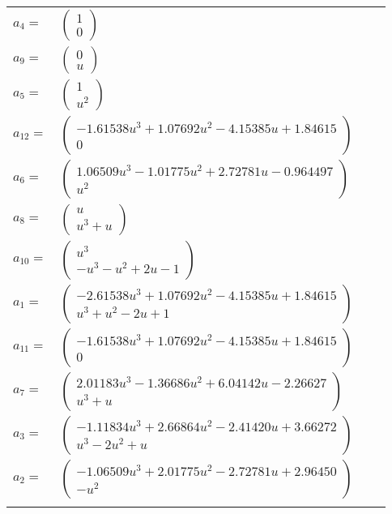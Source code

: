 \documentclass[1p]{elsarticle_modified}
\theoremstyle{definition}
\begin{document}
\begin{tabular}{m{7pt} m{180pt} m{7pt} m{180pt} }
\flushright $a_{4}=$&$\begin{pmatrix}1\\0\end{pmatrix}$ \\
\flushright $a_{9}=$&$\begin{pmatrix}0\\u\end{pmatrix}$ \\
\flushright $a_{5}=$&$\begin{pmatrix}1\\u^2\end{pmatrix}$ \\
\flushright $a_{12}=$&$\begin{pmatrix}-1.61538 u^{3}+1.07692 u^{2}-4.15385 u+1.84615\\0\end{pmatrix}$ \\
\flushright $a_{6}=$&$\begin{pmatrix}1.06509 u^{3}-1.01775 u^{2}+2.72781 u-0.964497\\u^2\end{pmatrix}$ \\
\flushright $a_{8}=$&$\begin{pmatrix}u\\u^3+u\end{pmatrix}$ \\
\flushright $a_{10}=$&$\begin{pmatrix}u^3\\- u^3- u^2+2 u-1\end{pmatrix}$ \\
\flushright $a_{1}=$&$\begin{pmatrix}-2.61538 u^{3}+1.07692 u^{2}-4.15385 u+1.84615\\u^3+u^2-2 u+1\end{pmatrix}$ \\
\flushright $a_{11}=$&$\begin{pmatrix}-1.61538 u^{3}+1.07692 u^{2}-4.15385 u+1.84615\\0\end{pmatrix}$ \\
\flushright $a_{7}=$&$\begin{pmatrix}2.01183 u^{3}-1.36686 u^{2}+6.04142 u-2.26627\\u^3+u\end{pmatrix}$ \\
\flushright $a_{3}=$&$\begin{pmatrix}-1.11834 u^{3}+2.66864 u^{2}-2.41420 u+3.66272\\u^3-2 u^2+u\end{pmatrix}$ \\
\flushright $a_{2}=$&$\begin{pmatrix}-1.06509 u^{3}+2.01775 u^{2}-2.72781 u+2.96450\\- u^2\end{pmatrix}$\\&\end{tabular}
\end{document}
